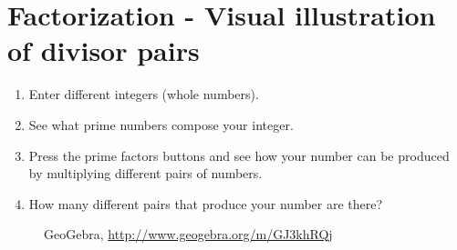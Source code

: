 \section{{Factorization - Visual illustration of divisor pairs}}
\begin{enumerate}[label=\arabic*.]

\item Enter different integers (whole numbers).

\item See what prime numbers compose your integer.

\item Press the prime factors buttons and see how your number can be produced by multiplying different pairs of numbers.

\item How many different pairs that produce your number are there?

\end{enumerate}

\begin{figure}[H]
\begin{center}
\caption*{GeoGebra, \url{http://www.geogebra.org/m/GJ3khRQj}}
\end{center}
\end{figure}

